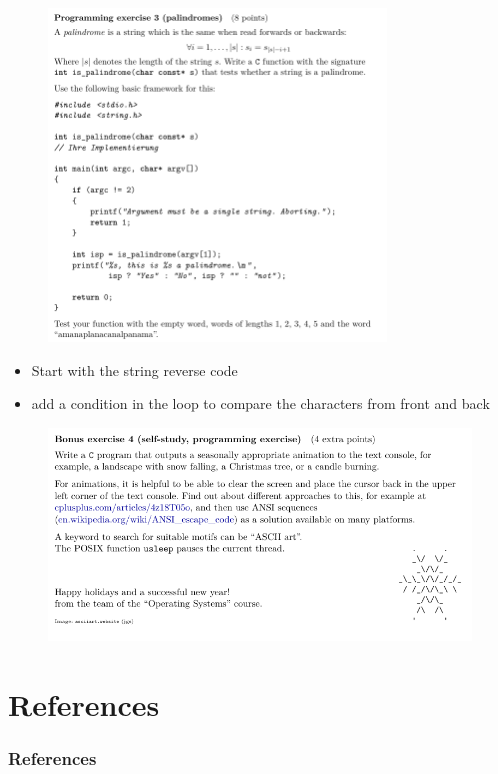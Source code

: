 \documentclass[10pt]{beamer}
\begin{document}
\begin{frame}{}
         \begin{figure}
          \includegraphics[keepaspectratio, width=0.8\textwidth, height=0.8\textheight-2\baselineskip-2\baselineskip]{img/ex6_102.png} \\
        \end{figure}
        \begin{itemize}
         \item Start with the string reverse code
         \item add a condition in the loop to compare the characters from front and back
        \end{itemize}
        \framebreak 
        
         \begin{figure}
          \includegraphics[keepaspectratio, width=\textwidth, height=\textheight]{img/ex6_103.png} \\
        \end{figure}
\end{frame}

\section{References}
    \begin{frame}[allowframebreaks]
      \frametitle{References}
      \begin{tiny}
      \nocite{*}
      \printbibliography
      \end{tiny}
    \end{frame}
\end{document}
